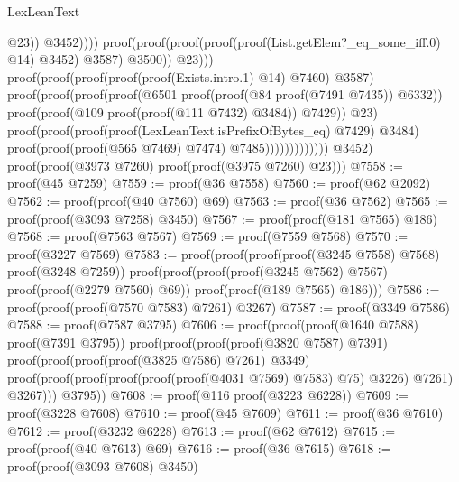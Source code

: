 \begin{lexlean}{LexLeanText}
\begin{coremodule}
                                                              @23))
                                                        @3452))))
                                            proof(proof(proof(proof(proof(List.getElem?_eq_some_iff.{0})
                                                      @14)
                                                    @3452)
                                                  @3587)
                                                @3500))
                                          @23)))
                                  proof(proof(proof(proof(proof(Exists.intro.{1}) @14) @7460) @3587)
                                      proof(proof(proof(proof(@6501
                                                proof(proof(@84 proof(@7491 @7435)) @6332))
                                              proof(proof(@109 proof(proof(@111 @7432) @3484))
                                                  @7429))
                                            @23)
                                          proof(proof(proof(proof(LexLeanText.isPrefixOfBytes_eq)
                                                  @7429)
                                                @3484)
                                              proof(proof(proof(@565 @7469) @7474)
                                                  @7485)))))))))))))
        @3452)
      proof(proof(@3973 @7260) proof(proof(@3975 @7260) @23)))
@7558 := proof(@45 @7259)
@7559 := proof(@36 @7558)
@7560 := proof(@62 @2092)
@7562 := proof(proof(@40 @7560) @69)
@7563 := proof(@36 @7562)
@7565 := proof(proof(@3093 @7258) @3450)
@7567 := proof(proof(@181 @7565) @186)
@7568 := proof(@7563 @7567)
@7569 := proof(@7559 @7568)
@7570 := proof(@3227 @7569)
@7583 := proof(proof(proof(proof(@3245 @7558) @7568) proof(@3248 @7259))
      proof(proof(proof(proof(@3245 @7562) @7567) proof(proof(@2279 @7560) @69))
          proof(proof(@189 @7565) @186)))
@7586 := proof(proof(proof(@7570 @7583) @7261) @3267)
@7587 := proof(@3349 @7586)
@7588 := proof(@7587 @3795)
@7606 := proof(proof(proof(@1640 @7588) proof(@7391 @3795))
      proof(proof(proof(proof(@3820 @7587) @7391)
            proof(proof(proof(proof(@3825 @7586) @7261) @3349)
                proof(proof(proof(proof(proof(proof(@4031 @7569) @7583) @75) @3226) @7261) @3267)))
          @3795))
@7608 := proof(@116 proof(@3223 @6228))
@7609 := proof(@3228 @7608)
@7610 := proof(@45 @7609)
@7611 := proof(@36 @7610)
@7612 := proof(@3232 @6228)
@7613 := proof(@62 @7612)
@7615 := proof(proof(@40 @7613) @69)
@7616 := proof(@36 @7615)
@7618 := proof(proof(@3093 @7608) @3450)

\end{coremodule}
\end{lexlean}
